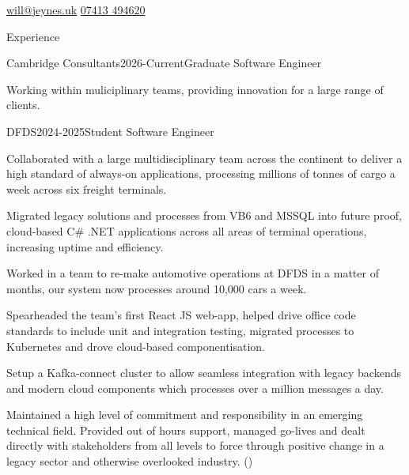 \documentclass[
	a4paper,
	12pt,
]{resume}
\begin{document}
\begin{center}
\href{mailto:will@jeynes.uk}{will@jeynes.uk} \vertline \href{tel:07413494620}{07413 494620}

 \vertline {}

\end{center}

\begin{rSection}{Experience}

\begin{rWorksection}{Cambridge Consultants}{2026-Current}{Graduate Software Engineer}
\item Working within muliciplinary teams, providing innovation for a large range of clients. 
\end{rWorksection}

	\begin{rWorksection}{DFDS}{2024-2025}{Student Software Engineer}
\item Collaborated with a large multidisciplinary team across the continent to deliver a high standard of always-on applications, processing millions of tonnes of cargo a week across six freight terminals.
\item Migrated legacy solutions and processes from VB6 and MSSQL into future proof, cloud-based C\# .NET applications across all areas of terminal operations, increasing uptime and efficiency. 
\item Worked in a team to re-make automotive operations at DFDS in a matter of months, our system now processes around 10,000 cars a week.
\item Spearheaded the team's first React JS web-app, helped drive office code standards to include unit and integration testing, migrated processes to Kubernetes and drove cloud-based componentisation.
\item Setup a Kafka-connect cluster to allow seamless integration with legacy backends and modern cloud components which processes over a million messages a day.
\item Maintained a high level of commitment and responsibility in an emerging technical field. Provided out of hours support, managed go-lives and dealt directly with stakeholders from all levels to force through positive change in a legacy sector and otherwise overlooked industry. () 
\end{rWorksection}
	

\end{rSection}
\end{document}
